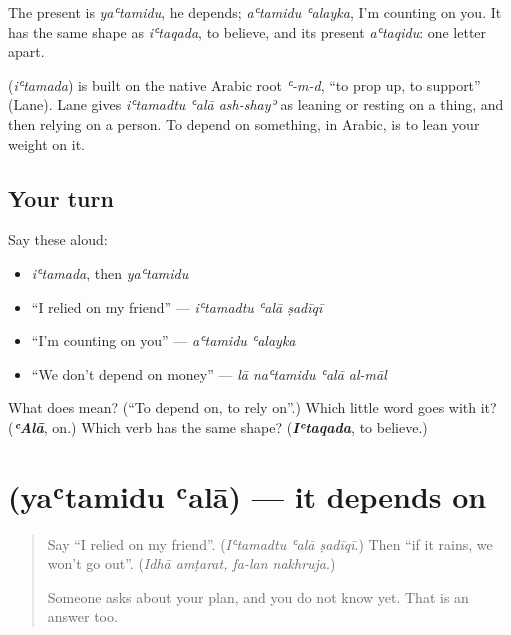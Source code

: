 The present is \emph{yaʿtamidu}, he depends; \emph{aʿtamidu ʿalayka}, I'm counting on you. It has the same shape as \emph{iʿtaqada}, to believe, and its present \emph{aʿtaqidu}: one letter apart.

\begin{cousinweb}
\textbf{} (\emph{iʿtamada}) is built on the native Arabic root \emph{ʿ-m-d}, \textquotedblleft{}to prop up, to support\textquotedblright{} (Lane). Lane gives \emph{iʿtamadtu ʿalā ash-shayʾ} as leaning or resting on a thing, and then relying on a person. To depend on something, in Arabic, is to lean your weight on it.
\end{cousinweb}

\subsection*{Your turn}
Say these aloud:

\begin{itemize}
\raggedright
  \item \emph{iʿtamada}, then \emph{yaʿtamidu}
  \item \textquotedblleft{}I relied on my friend\textquotedblright{} — \emph{iʿtamadtu ʿalā ṣadīqī}
  \item \textquotedblleft{}I'm counting on you\textquotedblright{} — \emph{aʿtamidu ʿalayka}
  \item \textquotedblleft{}We don't depend on money\textquotedblright{} — \emph{lā naʿtamidu ʿalā al-māl}
\end{itemize}

\begin{tcolorbox}[breakable,colback=teal!4,colframe=teal!35!black,title={Before you move on}]
What does  mean? (\textquotedblleft{}To depend on, to rely on\textquotedblright{}.) Which little word goes with it? (\emph{\textbf{ʿAlā}}, on.) Which verb has the same shape? (\emph{\textbf{Iʿtaqada}}, to believe.)
\end{tcolorbox}
\section[\texorpdfstring{\ar{يعتمد} \ar{على} (yaʿtamidu ʿalā)}{يعتمد على (yaʿtamidu ʿalā)}]{  (yaʿtamidu ʿalā) — it depends on}

\label{lesson:AR-C292-yatamidu-ala}



\begin{quote}
Say \textquotedblleft{}I relied on my friend\textquotedblright{}. (\emph{Iʿtamadtu ʿalā ṣadīqī}.) Then \textquotedblleft{}if it rains, we won't go out\textquotedblright{}. (\emph{Idhā amṭarat, fa-lan nakhruja}.)

Someone asks about your plan, and you do not know yet. That is an answer too.
\end{quote}

